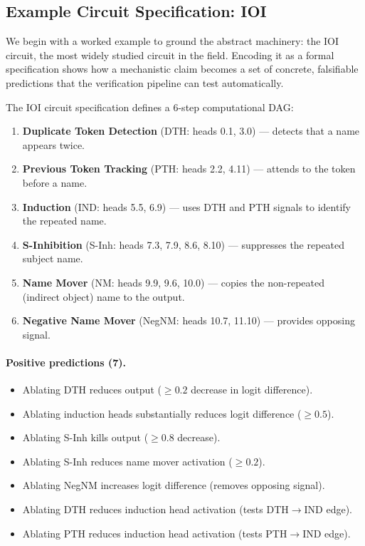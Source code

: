 \documentclass[10pt]{article}
\begin{document}
\subsection{Example Circuit Specification: IOI}

\label{appendix:ioi-detail}

We begin with a worked example to ground the abstract machinery: the IOI circuit,
the most widely studied circuit in the field.
Encoding it as a formal specification  shows how a mechanistic claim becomes a set of concrete, falsifiable predictions that the verification pipeline can test automatically.

The IOI circuit specification defines a 6-step computational DAG:

\begin{enumerate}[nosep]
    \item \textbf{Duplicate Token Detection} (DTH: heads 0.1, 3.0) --- detects that a name appears twice.
    \item \textbf{Previous Token Tracking} (PTH: heads 2.2, 4.11) --- attends to the token before a name.
    \item \textbf{Induction} (IND: heads 5.5, 6.9) --- uses DTH and PTH signals to identify the repeated name.
    \item \textbf{S-Inhibition} (S-Inh: heads 7.3, 7.9, 8.6, 8.10) --- suppresses the repeated subject name.
    \item \textbf{Name Mover} (NM: heads 9.9, 9.6, 10.0) --- copies the non-repeated (indirect object) name to the output.
    \item \textbf{Negative Name Mover} (NegNM: heads 10.7, 11.10) --- provides opposing signal.
\end{enumerate}

\paragraph{Positive predictions (7).}
\begin{itemize}[nosep]
    \item Ablating DTH reduces output ($\geq 0.2$ decrease in logit difference).
    \item Ablating induction heads substantially reduces logit difference ($\geq 0.5$).
    \item Ablating S-Inh kills output ($\geq 0.8$ decrease).
    \item Ablating S-Inh reduces name mover activation ($\geq 0.2$).
    \item Ablating NegNM increases logit difference (removes opposing signal).
    \item Ablating DTH reduces induction head activation (tests DTH$\rightarrow$IND edge).
    \item Ablating PTH reduces induction head activation (tests PTH$\rightarrow$IND edge).
\end{itemize}
\end{document}

